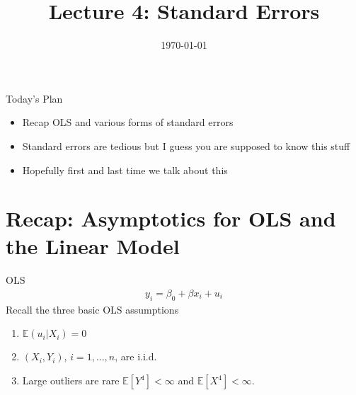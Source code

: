 

\title{Lecture 4: Standard Errors}





\date{\today}


\maketitle



\begin{frame}{Today's Plan}
\begin{itemize}
\item Recap OLS and various forms of standard errors
\item Standard errors are tedious but I guess you are supposed to know this stuff
\item Hopefully first and last time we talk about this
\end{itemize}
\end{frame}


\section{Recap: Asymptotics for OLS and the Linear Model}


\begin{frame}{OLS}
\begin{align*}
y_i = \beta_0 + \beta x_i + u_i
\end{align*}
Recall the three basic OLS assumptions
\begin{enumerate}
\item $\mathbb{E}(u_i |X_i ) = 0$
\item $(X_i,Y_i)$, $i =1,\ldots,n$, are i.i.d.
\item Large outliers are rare $\mathbb{E}[Y^4]< \infty$ and $\mathbb{E}[X^4]<\infty$.
\end{enumerate}
\end{frame}

